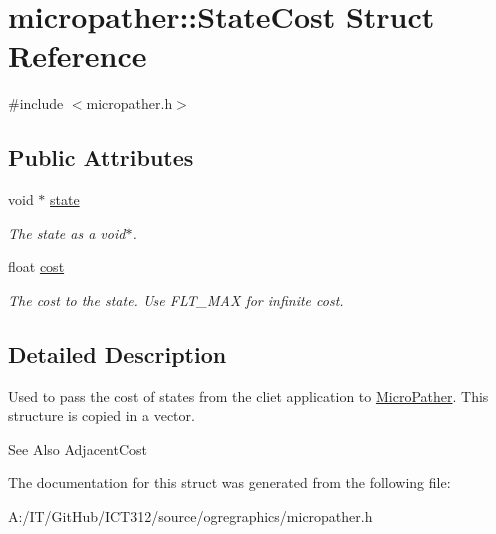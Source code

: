 \hypertarget{structmicropather_1_1_state_cost}{\section{micropather\-:\-:State\-Cost Struct Reference}
\label{structmicropather_1_1_state_cost}
}


{\ttfamily \#include $<$micropather.\-h$>$}

\subsection*{Public Attributes}
\begin{DoxyCompactItemize}
\item 
\hypertarget{structmicropather_1_1_state_cost_aad6ecf700ce5936f129b6ef34e732f97}{void $\ast$ \hyperlink{structmicropather_1_1_state_cost_aad6ecf700ce5936f129b6ef34e732f97}{state}}\label{structmicropather_1_1_state_cost_aad6ecf700ce5936f129b6ef34e732f97}

\begin{DoxyCompactList}\small\item\em The state as a void$\ast$. \end{DoxyCompactList}\item 
\hypertarget{structmicropather_1_1_state_cost_ad66ce8ebce4f7659995c011d0a01c61a}{float \hyperlink{structmicropather_1_1_state_cost_ad66ce8ebce4f7659995c011d0a01c61a}{cost}}\label{structmicropather_1_1_state_cost_ad66ce8ebce4f7659995c011d0a01c61a}

\begin{DoxyCompactList}\small\item\em The cost to the state. Use F\-L\-T\-\_\-\-M\-A\-X for infinite cost. \end{DoxyCompactList}\end{DoxyCompactItemize}


\subsection{Detailed Description}
Used to pass the cost of states from the cliet application to \hyperlink{classmicropather_1_1_micro_pather}{Micro\-Pather}. This structure is copied in a vector.

\begin{DoxySeeAlso}{See Also}
Adjacent\-Cost 
\end{DoxySeeAlso}


The documentation for this struct was generated from the following file\-:\begin{DoxyCompactItemize}
\item 
A\-:/\-I\-T/\-Git\-Hub/\-I\-C\-T312/source/ogregraphics/micropather.\-h\end{DoxyCompactItemize}
